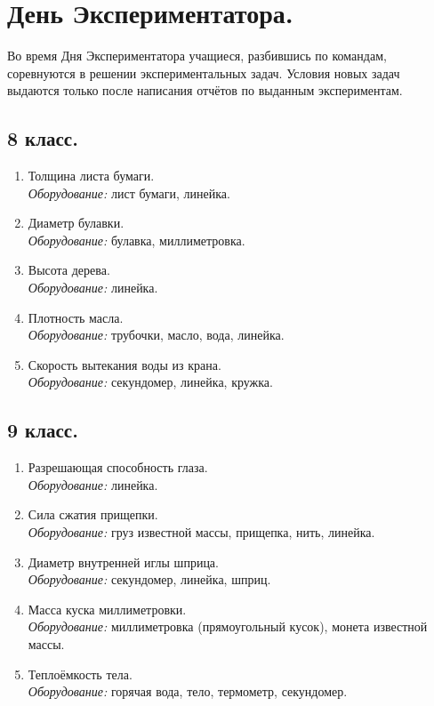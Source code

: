 \documentclass[12pt]{article}
\newlength{\h}
\newlength{\x}
\begin{document}
\clearpage

\section{День Экспериментатора. }
\label{sec:dayexp}

Во время Дня Экспериментатора учащиеся, разбившись по командам,
соревнуются в решении экспериментальных задач. Условия новых задач
выдаются только после написания отчётов по выданным экспериментам.

\subsection{8 класс. }
\label{sec:dayexp8}

\begin{enumerate}
\item Толщина листа бумаги.\\
  \textit{Оборудование:} лист бумаги, линейка.
\item Диаметр булавки. \\
  \textit{Оборудование:} булавка, миллиметровка.
\item Высота дерева.\\
  \textit{Оборудование:} линейка.
\item Плотность масла.\\
  \textit{Оборудование:} трубочки, масло, вода, линейка.
\item Скорость вытекания воды из крана.\\
  \textit{Оборудование:} секундомер, линейка, кружка.
\end{enumerate}

\subsection{9 класс.}
\label{sec:dayexp9}

\begin{enumerate}
\item Разрешающая способность глаза.\\
  \textit{Оборудование:} линейка.
\item Сила сжатия прищепки. \\
  \textit{Оборудование:} груз известной массы, прищепка, нить, линейка.
\item Диаметр внутренней иглы шприца. \\
  \textit{Оборудование:} секундомер, линейка, шприц.
\item Масса куска миллиметровки. \\
  \textit{Оборудование:} миллиметровка (прямоугольный кусок), монета
  известной массы. 
\item Теплоёмкость тела.\\
  \textit{Оборудование:} горячая вода, тело, термометр, секундомер.
\end{enumerate}
\end{document}
